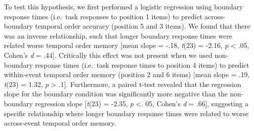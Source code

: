 To test this hypothesis, we first performed a logistic regression using
boundary response times (i.e.~task responses to position 1 items) to
predict across-boundary temporal order accuracy (position 5 and 3
items). We found that there was an inverse relationship, such that
longer boundary response times were related worse temporal order memory
{[}mean slope = -.18, \emph{t}(23) = -2.16, \emph{p} \textless{} .05,
Cohen's \emph{d} = .44{]}. Critically this effect was not present when
we used non-boundary response times (i.e.~task response times to
position 4 items) to predict within-event temporal order memory
(position 2 and 6 items) {[}mean slope = .19, \emph{t}(23) = 1.32,
\emph{p} \textgreater{} .1{]}. Furthermore, a paired t-test revealed
that the regression slope for the boundary condition was significantly
more negative than the non-boundary regression slope {[}\emph{t}(23) =
-2.35, \emph{p} \textless{}. 05, Cohen's \emph{d} = .66{]}, suggesting a
specific relationship where longer boundary response times were related
to worse across-event temporal order memory.

